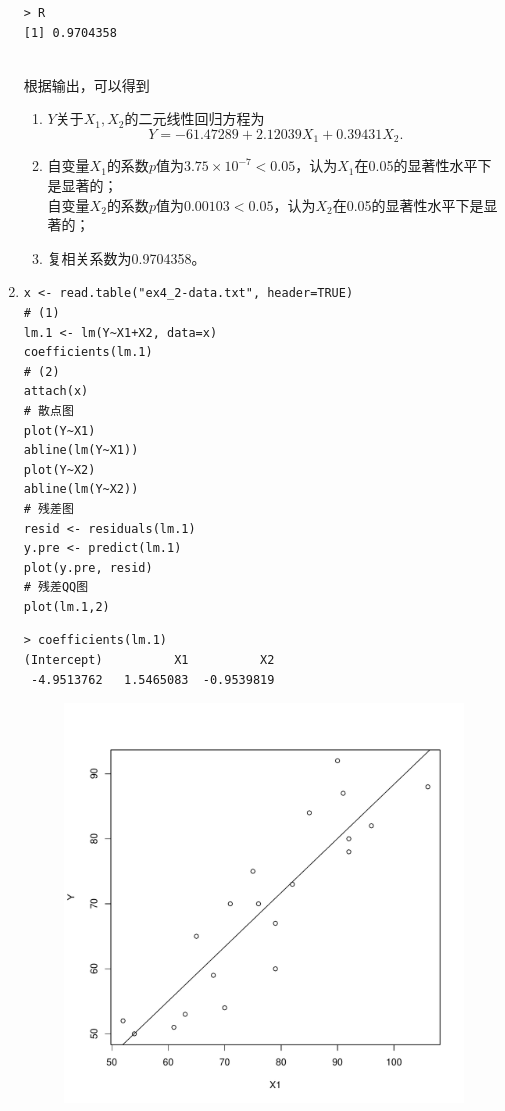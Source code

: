 \begin{enumerate}
\begin{lstlisting}
> R
[1] 0.9704358
\end{lstlisting}
        \summary\\
        根据输出，可以得到
        \begin{enumerate}[label=(\arabic*)]
            \item $Y$关于$X_1,X_2$的二元线性回归方程为
            \[Y=-61.47289+2.12039X_1+0.39431X_2.\]
            \item 自变量$X_1$的系数$p$值为$3.75\times 10^{-7}<0.05$，认为$X_1$在0.05的显著性水平下是显著的；\\自变量$X_2$的系数$p$值为$0.00103<0.05$，认为$X_2$在0.05的显著性水平下是显著的；
            \item 复相关系数为0.9704358。
        \end{enumerate}
        \item
        \code
\begin{lstlisting}
x <- read.table("ex4_2-data.txt", header=TRUE)
# (1)
lm.1 <- lm(Y~X1+X2, data=x)
coefficients(lm.1)
# (2)
attach(x)
# 散点图
plot(Y~X1)
abline(lm(Y~X1))
plot(Y~X2)
abline(lm(Y~X2))
# 残差图
resid <- residuals(lm.1)
y.pre <- predict(lm.1)
plot(y.pre, resid)
# 残差QQ图
plot(lm.1,2)
\end{lstlisting}
        \out
\begin{lstlisting}
> coefficients(lm.1)
(Intercept)          X1          X2 
 -4.9513762   1.5465083  -0.9539819
\end{lstlisting}
        \begin{figure}[H]
            \centering
            \includegraphics[scale=0.6]{4.2散点图Y-X1.pdf}

\end{figure}
\end{enumerate}

